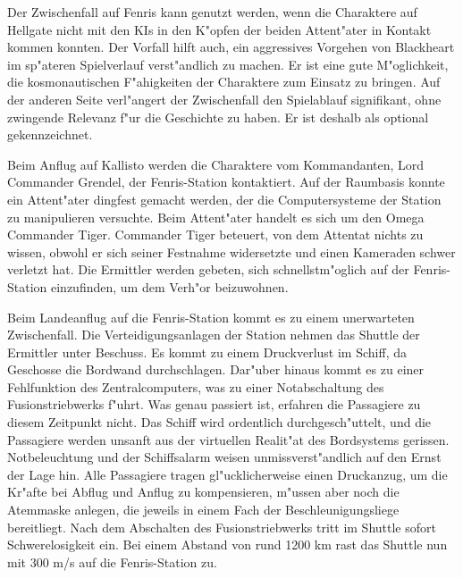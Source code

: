 
Der Zwischenfall auf Fenris kann genutzt werden, wenn die Charaktere auf Hellgate nicht mit den KIs in den K"opfen der beiden Attent"ater in Kontakt kommen konnten. Der Vorfall hilft auch, ein aggressives Vorgehen von Blackheart im sp"ateren Spielverlauf verst"andlich zu machen. Er ist eine gute M"oglichkeit, die kosmonautischen F"ahigkeiten der Charaktere zum Einsatz zu bringen. Auf der anderen Seite verl"angert der Zwischenfall den Spielablauf signifikant, ohne zwingende Relevanz f"ur die Geschichte zu haben. Er ist deshalb als optional gekennzeichnet.

Beim Anflug auf Kallisto werden die Charaktere vom Kommandanten, Lord Commander Grendel, der Fenris-Station kontaktiert. Auf der Raumbasis konnte ein Attent"ater dingfest gemacht werden, der die Computersysteme der Station zu manipulieren versuchte. Beim Attent"ater handelt es sich um den Omega Commander Tiger. Commander Tiger beteuert, von dem Attentat nichts zu wissen, obwohl er sich seiner Festnahme widersetzte und einen Kameraden schwer verletzt hat. Die Ermittler werden gebeten, sich schnellstm"oglich auf der Fenris-Station einzufinden, um dem Verh"or beizuwohnen.

Beim Landeanflug auf die Fenris-Station kommt es zu einem unerwarteten Zwischenfall. Die Verteidigungsanlagen der Station nehmen das Shuttle der Ermittler unter Beschuss. Es kommt zu einem Druckverlust im Schiff, da Geschosse die Bordwand durchschlagen. Dar"uber hinaus kommt es zu einer Fehlfunktion des Zentralcomputers, was zu einer Notabschaltung des Fusionstriebwerks f"uhrt. Was genau passiert ist, erfahren die Passagiere zu diesem Zeitpunkt nicht. Das Schiff wird ordentlich durchgesch"uttelt, und die Passagiere werden unsanft aus der virtuellen Realit"at des Bordsystems gerissen. Notbeleuchtung und der Schiffsalarm weisen unmissverst"andlich auf den Ernst der Lage hin. Alle Passagiere tragen gl"ucklicherweise einen Druckanzug, um die Kr"afte bei Abflug und Anflug zu kompensieren, m"ussen aber noch die Atemmaske anlegen, die jeweils in einem Fach der Beschleunigungsliege bereitliegt. Nach dem Abschalten des Fusionstriebwerks tritt im Shuttle sofort Schwerelosigkeit ein. Bei einem Abstand von rund 1200 km rast das Shuttle nun mit 300 m/s auf die Fenris-Station zu.

